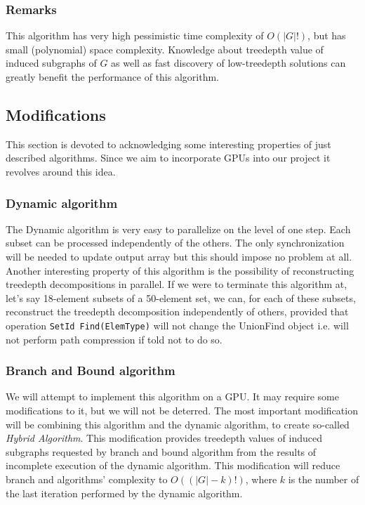 \subsubsection{Remarks}
This algorithm has very high pessimistic time complexity of $O\left(\left|G\right|!\right)$, but has small (polynomial) space complexity. Knowledge about treedepth value of induced subgraphs of $G$ as well as fast discovery of low-treedepth solutions can greatly benefit the performance of this algorithm.
\subsection{Modifications}
This section is devoted to acknowledging some interesting properties of just described algorithms. Since we aim to incorporate GPUs into our project it revolves around this idea.
\subsubsection{Dynamic algorithm}
The Dynamic algorithm is very easy to parallelize on the level of one step. Each subset can be processed independently of the others. The only synchronization will be needed to update output array but this should impose no problem at all. Another interesting property of this algorithm is the possibility of reconstructing treedepth decompositions in parallel. If we were to terminate this algorithm at, let's say 18-element subsets of a 50-element set, we can, for each of these subsets, reconstruct the treedepth decomposition independently of others, provided that operation \texttt{SetId Find(ElemType)} will not change the UnionFind object i.e. will not perform path compression if told not to do so.
\subsubsection{Branch and Bound algorithm}
We will attempt to implement this algorithm on a GPU. It may require some modifications to it, but we will not be deterred. The most important modification will be combining this algorithm and the dynamic algorithm, to create so-called \emph{Hybrid Algorithm}. This modification provides treedepth values of induced subgraphs requested by branch and bound algorithm from the results of incomplete execution of the dynamic algorithm. This modification will reduce branch and algorithms' complexity to $O\left(\left(\left|G\right|-k\right)!\right)$, where $k$ is the number of the last iteration performed by the dynamic algorithm.
